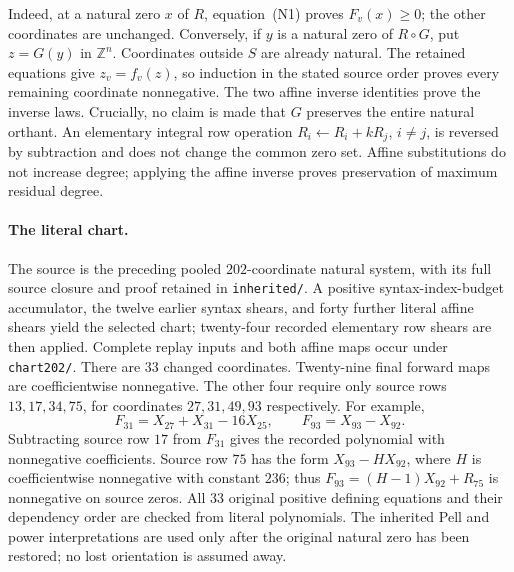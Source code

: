 Indeed, at a natural zero $x$ of $R$, equation~(N1) proves $F_v(x)\ge0$;
the other coordinates are unchanged. Conversely, if $y$ is a natural zero
of $R\circ G$, put $z=G(y)$ in $\mathbb Z^n$. Coordinates outside $S$ are
already natural. The retained equations give $z_v=f_v(z)$, so induction in
the stated source order proves every remaining coordinate nonnegative.
The two affine inverse identities prove the inverse laws. Crucially, no
claim is made that $G$ preserves the entire natural orthant.
An elementary integral row operation $R_i\leftarrow R_i+kR_j$, $i\ne j$,
is reversed by subtraction and does not change the common zero set.
Affine substitutions do not increase degree; applying the affine inverse
proves preservation of maximum residual degree.

\paragraph{The literal chart.}
The source is the preceding pooled $202$-coordinate natural system, with
its full source closure and proof retained in \texttt{inherited/}.
A positive syntax-index-budget accumulator, the twelve earlier syntax
shears, and forty further literal affine shears yield the selected chart;
twenty-four recorded elementary row shears are then applied. Complete replay
inputs and both affine maps occur under \texttt{chart202/}.
There are $33$ changed coordinates. Twenty-nine final forward maps are
coefficientwise nonnegative. The other four require only source rows
$13,17,34,75$, for coordinates $27,31,49,93$ respectively. For example,
\[
 F_{31}=X_{27}+X_{31}-16X_{25},\qquad F_{93}=X_{93}-X_{92}.
\]
Subtracting source row $17$ from $F_{31}$ gives the recorded polynomial
with nonnegative coefficients. Source row $75$ has the form
$X_{93}-HX_{92}$, where $H$ is coefficientwise nonnegative with constant
$236$; thus $F_{93}=(H-1)X_{92}+R_{75}$ is nonnegative on source zeros.
All $33$ original positive defining equations and their dependency order
are checked from literal polynomials. The inherited Pell and power
interpretations are used only after the original natural zero has been
restored; no lost orientation is assumed away.

